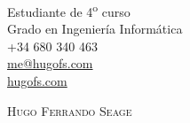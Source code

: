 \documentclass[a4paper, 11pt]{article}
\begin{document}
\pagestyle{empty} %

\begin{flushright}
    Estudiante de 4\textsuperscript{o} curso\\
    Grado en Ingeniería Informática\\
    +34 680 340 463\\
    \href{mailto: me@hugofs.com}{me@hugofs.com}\\
    \href{https://hugofs.com}{hugofs.com}\\
\end{flushright}

\vspace{-40mm}

\begin{figure}[ht!]
    \begin{flushleft}
    \end{flushleft}
\end{figure}

{\textsc {\Huge \vspace{5mm} \hspace{-13mm} Hugo Ferrando Seage}}\\
\end{document}
